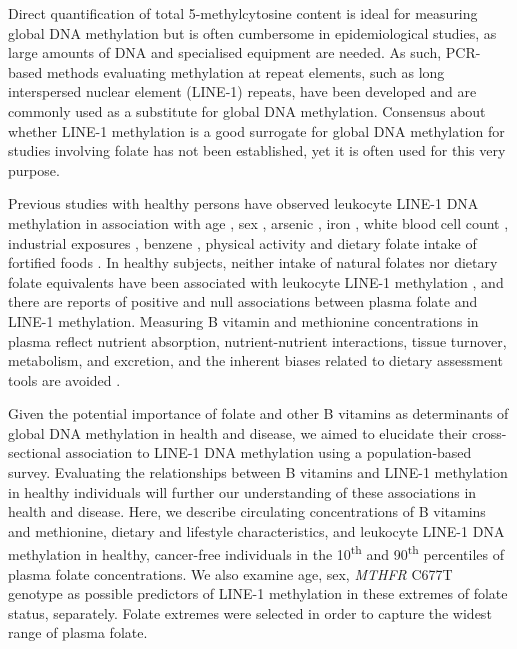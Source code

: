 \noindent Direct quantification of total 5-methylcytosine content is ideal for measuring global DNA methylation but is often cumbersome in epidemiological studies, as large amounts of DNA and specialised equipment are needed. As such, PCR-based methods evaluating methylation at repeat elements, such as long interspersed nuclear element (LINE-1) repeats, have been developed and are commonly used as a substitute for global DNA methylation. Consensus about whether LINE-1 methylation is a good surrogate for global DNA methylation for studies involving folate has not been established, yet it is often used for this very purpose.

\noindent Previous studies with healthy persons have observed leukocyte LINE-1 DNA methylation in association with age \cite{c37,c38,c39}, sex \cite{c310,c313}, arsenic \cite{c311}, iron \cite{c311}, white blood cell count \cite{c310}, industrial exposures \cite{c314}, benzene \cite{c315}, physical activity \cite{c316} and dietary folate intake of fortified foods \cite{c317}. In healthy subjects, neither intake of natural folates nor dietary folate equivalents have been associated with leukocyte LINE-1 methylation \cite{c317}, and there are reports of positive \cite{c318} and null associations \cite{c319} between plasma folate and LINE-1 methylation. Measuring B vitamin and methionine concentrations in plasma reflect nutrient absorption, nutrient-nutrient interactions, tissue turnover, metabolism, and excretion, and the inherent biases related to dietary assessment tools are avoided \cite{c320}.

\noindent Given the potential importance of folate and other B vitamins as determinants of global DNA methylation in health and disease, we aimed to elucidate their cross-sectional association to LINE-1 DNA methylation using a population-based survey. Evaluating the relationships between B vitamins and LINE-1 methylation in healthy individuals will further our understanding of these associations in health and disease. Here, we describe circulating concentrations of B vitamins and methionine, dietary and lifestyle characteristics, and leukocyte LINE-1 DNA methylation in healthy, cancer-free individuals in the 10\textsuperscript{th} and 90\textsuperscript{th} percentiles of plasma folate concentrations. We also examine age, sex, \emph{MTHFR} C677T genotype as possible predictors of LINE-1 methylation in these extremes of folate status, separately. Folate extremes were selected in order to capture the widest range of plasma folate. 

